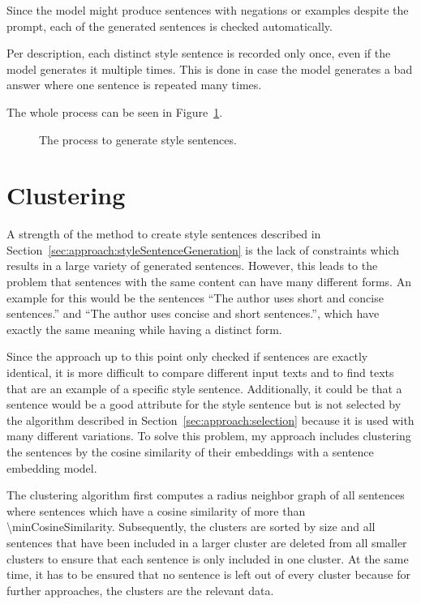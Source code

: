 Since the model might produce sentences with negations or examples despite the prompt, each of the generated sentences is checked automatically.

Per description, each distinct style sentence is recorded only once, even if the model generates it multiple times. This is done in case the model generates a bad answer where one sentence is repeated many times.

The whole process can be seen in Figure~\ref{fig:styleSentenceGeneration}.

\begin{figure}[ht]
  
  \caption{The process to generate style sentences.}
  \label{fig:styleSentenceGeneration}
\end{figure}


\section{Clustering}
\label{sec:approach:clustering}
A strength of the method to create style sentences described in Section~\ref{sec:approach:styleSentenceGeneration} is the lack of constraints which results in a large variety of generated sentences. However, this leads to the problem that sentences with the same content can have many different forms. An example for this would be the sentences \enquote{The author uses short and concise sentences.} and \enquote{The author uses concise and short sentences.}, which have exactly the same meaning while having a distinct form.

Since the approach up to this point only checked if sentences are exactly identical, it is more difficult to compare different input texts and to find texts that are an example of a specific style sentence. Additionally, it could be that a sentence would be a good attribute for the style sentence but is not selected by the algorithm described in Section~\ref{sec:approach:selection} because it is used with many different variations.
To solve this problem, my approach includes clustering the sentences by the cosine similarity of their embeddings with a sentence embedding model. %

The clustering algorithm first computes a radius neighbor graph of all sentences where sentences which have a cosine similarity of more than \num{\minCosineSimilarity}. Subsequently, the clusters are sorted by size and all sentences that have been included in a larger cluster are deleted from all smaller clusters to ensure that each sentence is only included in one cluster. At the same time, it has to be ensured that no sentence is left out of every cluster because for further approaches, the clusters are the relevant data.

